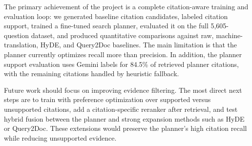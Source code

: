 The primary achievement of the project is a complete citation-aware training and evaluation loop: we generated baseline citation candidates, labeled citation support, trained a fine-tuned search planner, evaluated it on the full 5,605-question dataset, and produced quantitative comparisons against raw, machine-translation, HyDE, and Query2Doc baselines. The main limitation is that the planner currently optimizes recall more than precision. In addition, the planner support evaluation uses Gemini labels for 84.5\% of retrieved planner citations, with the remaining citations handled by heuristic fallback.

Future work should focus on improving evidence filtering. The most direct next steps are to train with preference optimization over supported versus unsupported citations, add a citation-specific reranker after retrieval, and test hybrid fusion between the planner and strong expansion methods such as HyDE or Query2Doc. These extensions would preserve the planner's high citation recall while reducing unsupported evidence.
